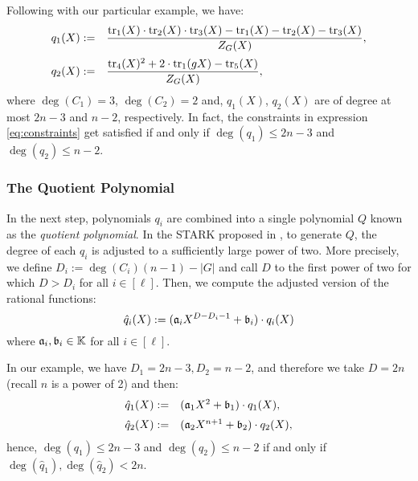 Following with our particular example, we have:
\begin{align*}
\begin{array}{rl}
q_1(X) := &\displaystyle \frac{\text{tr}_1(X) \cdot \text{tr}_2(X) \cdot \text{tr}_3(X) - \text{tr}_1(X) - \text{tr}_2(X) - \text{tr}_3(X)}{Z_{G}(X)}, \\[0.4cm]
q_2(X) := &\displaystyle \frac{\text{tr}_4(X)^2 + 2 \cdot \text{tr}_1(gX) - \text{tr}_5(X)}{Z_G(X)},
\end{array}
\end{align*}
where $\deg(C_1)=3$, $\deg(C_2)=2$ and, $q_1(X)$, $q_2(X)$ are of degree at most $2n-3$ and $n-2$, respectively.
In fact, the constraints in expression \eqref{eq:constraints} get satisfied if and only if $\deg(q_1) \leq 2n - 3$ and $\deg(q_2) \leq n - 2$. 



\subsubsection*{The Quotient Polynomial}\label{sec:constraint-polynomial}

In the next step, polynomials $q_i$ are combined into a single polynomial $Q$ known as the \textit{quotient polynomial}. In the STARK proposed in \cite{EPRINT:StarkWare21}, to generate $Q$, the degree of each $q_i$ is adjusted to a sufficiently large power of two.
More precisely, we define $D_i := \deg(C_i)(n-1) - |G|$ and call $D$ to the first power of two for which $D > D_i$ for all $i \in [\ell]$. 
Then, we compute the adjusted version of the rational functions:
\begin{equation}\label{eq:adjusted}
\hat{q}_i(X) := (\mathfrak{a}_iX^{D-D_i-1} + \mathfrak{b}_i) \cdot q_i(X)
\end{equation}
where $\mathfrak{a}_i, \mathfrak{b}_i \in \mathbb{K}$ for all $i\in[\ell]$.

In our example, we have $D_1 = 2n-3,D_2=n-2$, and therefore we take $D = 2n$ (recall $n$ is a power of 2) and then: 
\begin{align*}
\begin{array}{rl}
\hat{q}_1(X) := &(\mathfrak{a}_1 X^2 + \mathfrak{b}_1) \cdot q_1(X) , \\[0.2cm]
\hat{q}_2(X) := &(\mathfrak{a}_2 X^{n+1} + \mathfrak{b}_2) \cdot q_2(X) ,
\end{array}
\end{align*} 
hence, $\deg(q_1) \leq 2n-3$ and $\deg(q_2) \leq n - 2$ if and only if $\deg(\hat{q}_1),\deg(\hat{q}_2) < 2n$.

